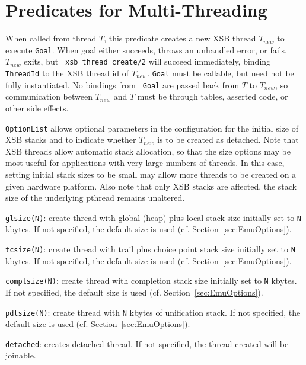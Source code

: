 \section{Predicates for Multi-Threading} \label{sec:mt-threading}

\begin{description}

%
When called from thread $T$, this predicate creates a new XSB thread
$T_{new}$ to execute {\tt Goal}.  When goal either succeeds, throws an
unhandled error, or fails, $T_{new}$ exits, but {\tt
  xsb\_thread\_create/2} will succeed immediately, binding {\tt
  ThreadId} to the XSB thread id of $T_{new}$.  {\tt Goal} must be
callable, but need not be fully instantiated.  No bindings from {\tt
  Goal} are passed back from $T$ to $T_{new}$, so communication
between $T_{new}$ and $T$ must be through tables, asserted code, or
other side effects.

{\tt OptionList} allows optional parameters in the configuration for
the initial size of XSB stacks and to indicate whether $T_{new}$ is to
be created as detached.  Note that XSB threads allow automatic stack
allocation, so that the size options may be most useful for
applications with very large numbers of threads.  In this case,
setting initial stack sizes to be small may allow more threads to be
created on a given hardware platform.  Also note that only XSB stacks
are affected, the stack size of the underlying pthread remains
unaltered.
%
\bi
\item {\tt glsize(N)}: create thread with global (heap) plus local
  stack size initially set to {\tt N} kbytes.  If not specified, the
  default size is used (cf. Section~\ref{sec:EmuOptions}).
%
\item {\tt tcsize(N)}: create thread with trail plus choice point 
  stack size initially set to {\tt N} kbytes.  If not specified, the
  default size is used (cf. Section~\ref{sec:EmuOptions}).
%
\item {\tt complsize(N)}: create thread with completion
  stack size initially set to {\tt N} kbytes. If not specified, the
  default size is used (cf. Section~\ref{sec:EmuOptions}).
%
\item {\tt pdlsize(N)}: create thread with {\tt N} kbytes of
  unification stack.  If not specified, the
  default size is used (cf. Section~\ref{sec:EmuOptions}).
%
\item {\tt detached}: creates detached thread.  If not specified, the
  thread created will be joinable.
\ei


\end{description}
